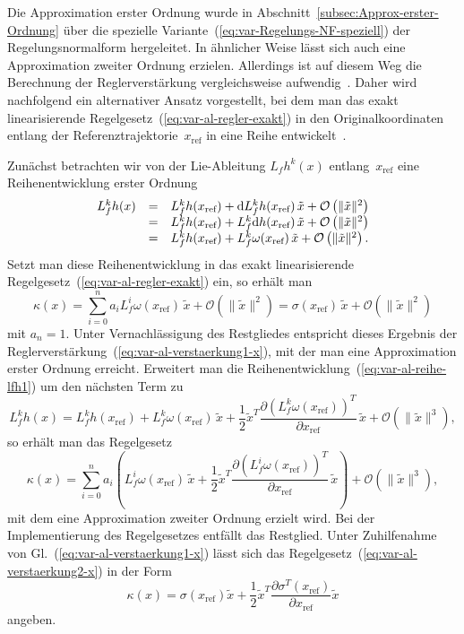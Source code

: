 Die Approximation erster Ordnung wurde in Abschnitt~\ref{subsec:Approx-erster-Ordnung}
über die spezielle Variante~(\ref{eq:var-Regelungs-NF-speziell})
der Regelungsnormalform hergeleitet. In ähnlicher Weise lässt sich
auch eine Approximation zweiter Ordnung erzielen. Allerdings ist auf
diesem Weg die Berechnung der Reglerverstärkung vergleichsweise aufwendig~\cite{paschke2011da}.
Daher wird nachfolgend ein alternativer Ansatz vorgestellt, bei dem
man das exakt linearisierende Regelgesetz~(\ref{eq:var-al-regler-exakt})
in den Originalkoordinaten entlang der Referenztrajektorie~$x_{\text{ref}}$
in eine Reihe entwickelt~\cite{franke2015buch}.

Zunächst betrachten wir von der Lie-Ableitung $L_{f}h^{k}(x)$ entlang~$x_{\text{ref}}$
eine Reihenentwicklung erster Ordnung
\begin{equation}
\begin{array}{ccl}
L_{f}^{k}h(x) & = & L_{f}^{k}h(x_{\text{ref}})+{\mathrm{d}} L_{f}^{k}h(x_{\text{ref}})\,\tilde{x}+\mathcal{O}\left(\|\tilde{x}\|^{2}\right)\\
 & = & L_{f}^{k}h(x_{\text{ref}})+L_{f}^{k}{\mathrm{d}} h(x_{\text{ref}})\,\tilde{x}+\mathcal{O}\left(\|\tilde{x}\|^{2}\right)\\
 & = & L_{f}^{k}h(x_{\text{ref}})+L_{f}^{k}\omega(x_{\text{ref}})\,\tilde{x}+\mathcal{O}\left(\|\tilde{x}\|^{2}\right).
\end{array}\label{eq:var-al-reihe-lfh1}
\end{equation}
Setzt man diese Reihenentwicklung in das exakt linearisierende Regelgesetz~(\ref{eq:var-al-regler-exakt})
ein, so erhält man
\[
\kappa(x)=\sum_{i=0}^{n}a_{i}L_{f}^{i}\omega(x_{\text{ref}})\,\tilde{x}+\mathcal{O}\left(\|\tilde{x}\|^{2}\right)={\displaystyle \sigma(x_{\text{ref}})}\,\tilde{x}+\mathcal{O}\left(\|\tilde{x}\|^{2}\right)
\]
mit $a_{n}=1$. Unter Vernachlässigung des Restgliedes entspricht
dieses Ergebnis der Reglerverstärkung~(\ref{eq:var-al-verstaerkung1-x}),
mit der man eine Approximation erster Ordnung erreicht. Erweitert
man die Reihenentwicklung~(\ref{eq:var-al-reihe-lfh1}) um den nächsten
Term zu
\[
L_{f}^{k}h(x)=L_{f}^{k}h(x_{\text{ref}})+L_{f}^{k}\omega(x_{\text{ref}})\,\tilde{x}+\frac{1}{2}\tilde{x}^{T}\frac{\partial\left(L_{f}^{k}\omega(x_{\text{ref}})\right)^{T}}{\partial x_{\text{ref}}}\,\tilde{x}+\mathcal{O}\left(\|\tilde{x}\|^{3}\right),
\]
so erhält man das Regelgesetz
\begin{equation}
\kappa(x)=\sum_{i=0}^{n}a_{i}\left(L_{f}^{i}\omega(x_{\text{ref}})\,\tilde{x}+\frac{1}{2}\tilde{x}^{T}\frac{\partial\left(L_{f}^{i}\omega(x_{\text{ref}})\right)^{T}}{\partial x_{\text{ref}}}\,\tilde{x}\right)+\mathcal{O}\left(\|\tilde{x}\|^{3}\right),\label{eq:var-al-verstaerkung2-x}
\end{equation}
mit dem eine Approximation zweiter Ordnung erzielt wird. Bei der Implementierung
des Regelgesetzes entfällt das Restglied. Unter Zuhilfenahme von Gl.~(\ref{eq:var-al-verstaerkung1-x})
lässt sich das Regelgesetz~(\ref{eq:var-al-verstaerkung2-x}) in
der Form 
\[
\kappa(x)=\sigma(x_{\text{ref}})\tilde{x}+\frac{1}{2}\tilde{x}^{T}\frac{\partial\sigma^{T}(x_{\text{ref}})}{\partial x_{\text{ref}}}\tilde{x}
\]
angeben.

